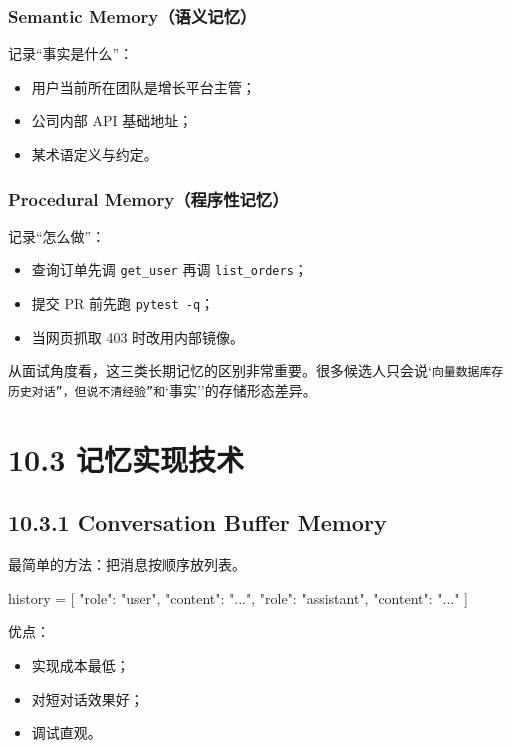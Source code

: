 \subsubsection{Semantic Memory（语义记忆）}

记录``事实是什么''：


\begin{itemize}[leftmargin=2em]
\item 用户当前所在团队是增长平台主管；
\item 公司内部 API 基础地址；
\item 某术语定义与约定。
\end{itemize}

\subsubsection{Procedural Memory（程序性记忆）}

记录``怎么做''：


\begin{itemize}[leftmargin=2em]
\item 查询订单先调 \texttt{get\_user} 再调 \texttt{list\_orders}；
\item 提交 PR 前先跑 \texttt{pytest -q}；
\item 当网页抓取 403 时改用内部镜像。
\end{itemize}

从面试角度看，这三类长期记忆的区别非常重要。很多候选人只会说`\texttt{向量数据库存历史对话''，但说不清}\texttt{经验''和}`事实''的存储形态差异。


\section{10.3 记忆实现技术}

\subsection{10.3.1 Conversation Buffer Memory}

最简单的方法：把消息按顺序放列表。


\begin{codeblock}
history = [
    {"role": "user", "content": "..."},
    {"role": "assistant", "content": "..."}
]
\end{codeblock}

优点：


\begin{itemize}[leftmargin=2em]
\item 实现成本最低；
\item 对短对话效果好；
\item 调试直观。
\end{itemize}

